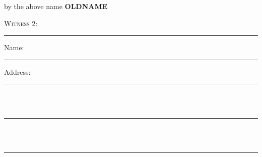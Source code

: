 \documentclass[10pt, twoside, a4paper]{article}
\renewcommand{\oldname}{\textbf{OLDNAME}}
\begin{document}
\begin{multicols}{2}
	{
		\centering
		\noindent
		by the above name \oldname{}
		\par
	}

	\vspace{60pt}

	{\scshape \noindent Witness 2:}

	\vspace{48pt}
	\par\noindent\hrule
	\vspace{14pt}

	{
		\scshape

		\noindent Name: \\
		\noindent\hspace*{4em}\rule{0.35\textwidth}{0.5pt}

		\vspace{12pt}

		\noindent Address:

		\noindent\hspace*{4em}\rule{0.35\textwidth}{0.5pt} \\ \\
		\noindent\hspace*{4em}\rule{0.35\textwidth}{0.5pt} \\ \\
		\noindent\hspace*{4em}\rule{0.35\textwidth}{0.5pt}
	}

\end{multicols}


\end{document}
